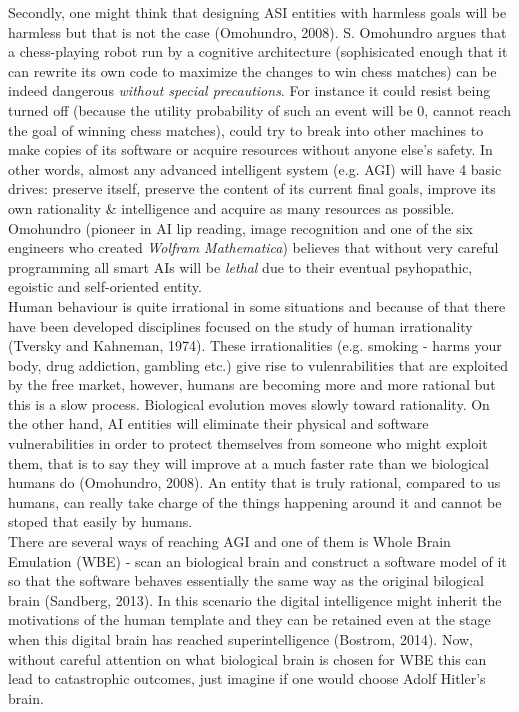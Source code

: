 \documentclass[11pt]{article}
\begin{document}
	\indent
	Secondly, one might think that designing ASI entities with harmless goals will be harmless but that is not the case (Omohundro, 2008).
S. Omohundro argues that a chess-playing robot run by a cognitive architecture (sophisicated enough that it can rewrite its own code to maximize the changes to win chess matches) can be indeed dangerous \textit{without special precautions}. For instance it could resist being turned off (because the utility probability of such an event will be 0, cannot reach the goal of winning chess matches), could try to break into other machines to make copies of its software  or acquire resources without anyone else's safety. In other words, almost any advanced intelligent system (e.g. AGI) will have 4 basic drives: preserve itself, preserve the content of its current final goals, improve its own rationality \& intelligence and acquire as many resources as possible. Omohundro (pioneer in AI lip reading, image recognition and one of the six engineers who created \textit{Wolfram Mathematica}) believes that without very careful programming all smart AIs will be \textit{lethal} due to their eventual psyhopathic, egoistic and self-oriented entity.\\


	\indent
	Human behaviour is quite irrational in some situations and because of that there have been developed disciplines focused on the study of human irrationality (Tversky and Kahneman, 1974). These irrationalities (e.g. smoking - harms your body, drug addiction, gambling etc.) give rise to vulenrabilities that are exploited by the free market, however, humans are becoming more and more rational but this is a slow process. Biological evolution moves slowly toward rationality. On the other hand, AI entities will eliminate their physical  and software vulnerabilities in order to protect themselves from someone who might exploit them, that is to say they will  improve at a much faster rate than we biological humans do (Omohundro, 2008). An entity that is truly rational, compared to us humans, can really take charge of the things happening around it and cannot be stoped that easily by humans.\\

	\indent
	There are several ways of reaching AGI and one of them is Whole Brain Emulation (WBE) - scan an biological brain and construct a software model of it so that the software behaves essentially the same way as the original bilogical brain (Sandberg, 2013). In this scenario the digital intelligence might inherit the motivations of the human template and they can be retained even at the stage when this digital brain has reached superintelligence (Bostrom, 2014). Now, without careful attention on what biological brain is chosen for WBE this can lead to catastrophic outcomes, just imagine if one would choose Adolf Hitler's brain. \\
 
\end{document}
